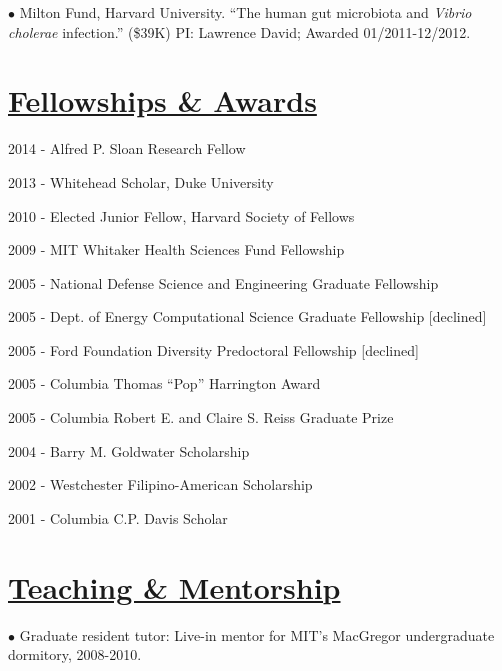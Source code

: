 \documentclass[overlapped,line,11pt]{res}
\newenvironment{list1}{
  \begin{list}{\ding{113}}{%
      \setlength{\itemsep}{0in}
      \setlength{\parsep}{0in} \setlength{\parskip}{0in}
      \setlength{\topsep}{0in} \setlength{\partopsep}{0in} 
      \setlength{\leftmargin}{0.17in}}}{\end{list}}
\begin{document}
\begin{resume}
\vspace{-10mm}
\hangindent=0.5in $\bullet$\hspace{.1in} Milton Fund, Harvard
University. ``The human gut microbiota and \emph{Vibrio cholerae}
infection.'' (\$39K) PI: Lawrence David; Awarded 01/2011-12/2012. 

\section{\underline{\sc Fellowships \& Awards}} 
\vspace{.25in}
\begin{list1}
\item[] 2014 - Alfred P. Sloan Research Fellow %
\item[] 2013 - Whitehead Scholar, Duke University%
\item[] 2010 - Elected Junior Fellow, Harvard Society of Fellows%
\item[] 2009 - MIT Whitaker Health Sciences Fund Fellowship %
\item[] 2005 - National Defense Science and Engineering Graduate
  Fellowship %
\item[] 2005 - Dept. of Energy Computational Science Graduate Fellowship
  [declined] %
\item[] 2005 - Ford Foundation Diversity Predoctoral Fellowship
  [declined] %
\item[] 2005 - Columbia Thomas ``Pop'' Harrington Award
\item[] 2005 - Columbia Robert E. and Claire S. Reiss Graduate Prize
\item[] 2004 - Barry M. Goldwater Scholarship
\item[] 2002 - Westchester Filipino-American Scholarship
\item[] 2001 - Columbia C.P. Davis Scholar
\end{list1}

\section{\underline{\sc Teaching \& Mentorship}}
\vspace{.05in}

\hangindent=0.5in $\bullet$\hspace{.1in} Graduate resident tutor:
Live-in mentor for MIT's MacGregor undergraduate dormitory, 2008-2010.  \\


\end{resume}
\end{document}
